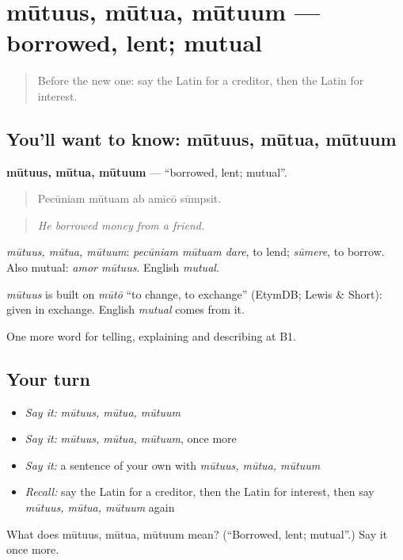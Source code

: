 \section[mūtuus, mūtua, mūtuum]{mūtuus, mūtua, mūtuum — borrowed, lent; mutual}

\label{lesson:LA-C418-mutuus}



\begin{quote}
Before the new one: say the Latin for a creditor, then the Latin for interest.
\end{quote}

\subsection*{You'll want to know: mūtuus, mūtua, mūtuum}
\textbf{mūtuus, mūtua, mūtuum} — \textquotedblleft{}borrowed, lent; mutual\textquotedblright{}.

\begin{quote}
Pecūniam mūtuam ab amīcō sūmpsit.
\end{quote}

\begin{quote}
\emph{He borrowed money from a friend.}
\end{quote}

\emph{mūtuus, mūtua, mūtuum}: \emph{pecūniam mūtuam dare}, to lend; \emph{sūmere}, to borrow. Also mutual: \emph{amor mūtuus}. English \emph{mutual}.

\begin{cousinweb}
\emph{mūtuus} is built on \emph{mūtō} \textquotedblleft{}to change, to exchange\textquotedblright{} (EtymDB; Lewis \& Short): given in exchange. English \emph{mutual} comes from it.
\end{cousinweb}

\begin{grammarlens}[title={What you've built}]
One more word for telling, explaining and describing at B1.
\end{grammarlens}

\subsection*{Your turn}
\begin{itemize}
\raggedright
  \item \emph{Say it:} \emph{mūtuus, mūtua, mūtuum}
  \item \emph{Say it:} \emph{mūtuus, mūtua, mūtuum}, once more
  \item \emph{Say it:} a sentence of your own with \emph{mūtuus, mūtua, mūtuum}
  \item \emph{Recall:} say the Latin for a creditor, then the Latin for interest, then say \emph{mūtuus, mūtua, mūtuum} again
\end{itemize}

\begin{tcolorbox}[breakable,colback=teal!4,colframe=teal!35!black,title={Before you move on}]
What does mūtuus, mūtua, mūtuum mean? (\textquotedblleft{}Borrowed, lent; mutual\textquotedblright{}.) Say it once more.
\end{tcolorbox}
